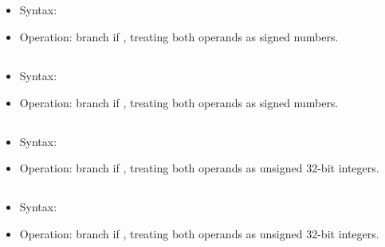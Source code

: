 \subsection{}

\begin{itemize}
  \item Syntax: 
  \item Operation: branch if , treating both operands as signed
        numbers.
\end{itemize}

\subsection{}

\begin{itemize}
  \item Syntax: 
  \item Operation: branch if , treating both operands as signed
        numbers.
\end{itemize}

\subsection{}

\begin{itemize}
  \item Syntax: 
  \item Operation: branch if , treating both operands as unsigned
        32-bit integers.
\end{itemize}

\subsection{}

\begin{itemize}
  \item Syntax: 
  \item Operation: branch if , treating both operands as
        unsigned 32-bit integers.
\end{itemize}

\subsection{}

